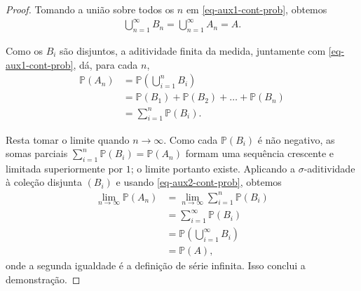 \documentclass[12pt,portuguese]{article}
\theoremstyle{definition}
\begin{document}
\begin{proof}
Tomando a união sobre todos os \(n\) em \eqref{eq-aux1-cont-prob}, obtemos
\begin{align}\label{eq-aux2-cont-prob}
\bigcup_{n=1}^{\infty} B_n = \bigcup_{n=1}^{\infty} A_n  = A.
\end{align}

Como os \(B_i\) são disjuntos, a aditividade finita da medida, juntamente com
\eqref{eq-aux1-cont-prob}, dá, para cada \(n\),
%
\begin{align*}
\mathbb{P}(A_n)
&= \mathbb{P}\left( \bigcup_{i=1}^n B_i \right) \\
&= \mathbb{P}(B_1)+\mathbb{P}(B_2)+\ldots+\mathbb{P}(B_n)
\\
&= \sum_{i=1}^{n} \mathbb{P}(B_i).
\end{align*}


Resta tomar o limite quando \(n \to \infty\). Como cada \(\mathbb{P}(B_i)\) é
não negativo, as somas parciais
\(\sum_{i=1}^n \mathbb{P}(B_i) = \mathbb{P}(A_n)\) formam uma sequência
crescente e limitada superiormente por \(1\); o limite portanto existe.
Aplicando a $\sigma$-aditividade à coleção disjunta \((B_i)\) e usando
\eqref{eq-aux2-cont-prob}, obtemos
\begin{align*}
\lim_{n\to\infty} \mathbb{P}(A_n)
&= \lim_{n\to\infty}\sum_{i=1}^{n} \mathbb{P}(B_i) \\
&= \sum_{i=1}^{\infty} \mathbb{P}(B_i) \\
&= \mathbb{P}\left( \bigcup_{i=1}^{\infty} B_i\right) \\
&= \mathbb{P}(A),
\end{align*}
onde a segunda igualdade é a definição de série infinita. Isso conclui a
demonstração.
\end{proof}
\end{document}
